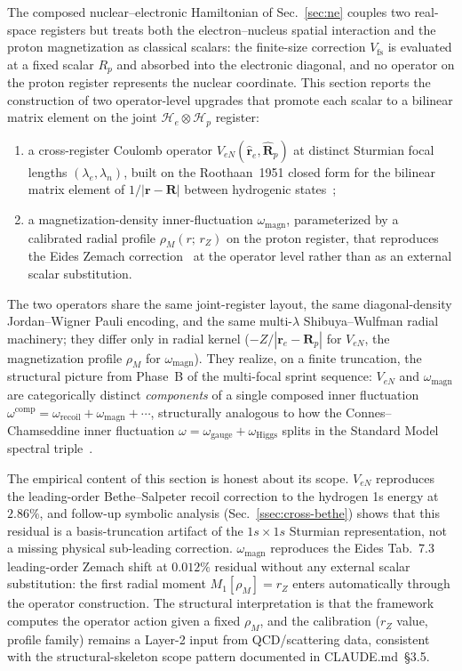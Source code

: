 \documentclass[twocolumn,prc,amsmath,amssymb,superscriptaddress]{revtex4-2}
\begin{document}
The composed nuclear--electronic Hamiltonian of Sec.~\ref{sec:ne} couples
two real-space registers but treats both the electron--nucleus spatial
interaction and the proton magnetization as classical scalars: the
finite-size correction $V_{\mathrm{fs}}$ is evaluated at a fixed scalar
$R_p$ and absorbed into the electronic diagonal, and no operator on the
proton register represents the nuclear coordinate. This section
reports the construction of two operator-level upgrades that promote
each scalar to a bilinear matrix element on the joint
$\mathcal{H}_e \otimes \mathcal{H}_p$ register:
\begin{enumerate}
  \item a cross-register Coulomb operator
    $V_{eN}(\hat{\mathbf{r}}_e, \hat{\mathbf{R}}_p)$ at distinct
    Sturmian focal lengths $(\lambda_e, \lambda_n)$, built on the
    Roothaan~1951 closed form for the bilinear matrix element of
    $1/|\mathbf{r} - \mathbf{R}|$ between hydrogenic
    states~\cite{Roothaan1951};
  \item a magnetization-density inner-fluctuation
    $\omega_{\mathrm{magn}}$, parameterized by a calibrated radial
    profile $\rho_M(r;\,r_Z)$ on the proton register, that reproduces
    the Eides Zemach correction~\cite{EidesGrotchShelyuto2007,Eides2024}
    at the operator level rather than as an external scalar substitution.
\end{enumerate}
The two operators share the same joint-register layout, the same
diagonal-density Jordan--Wigner Pauli encoding, and the same multi-$\lambda$
Shibuya--Wulfman radial machinery; they differ only in radial kernel
($-Z/|\mathbf{r}_e - \mathbf{R}_p|$ for $V_{eN}$, the magnetization
profile $\rho_M$ for $\omega_{\mathrm{magn}}$). They realize, on a finite
truncation, the structural picture from Phase~B of the multi-focal
sprint sequence: $V_{eN}$ and $\omega_{\mathrm{magn}}$ are categorically
distinct \emph{components} of a single composed inner fluctuation
$\omega^{\mathrm{comp}} = \omega_{\mathrm{recoil}} + \omega_{\mathrm{magn}}
+ \cdots$, structurally analogous to how the Connes--Chamseddine inner
fluctuation $\omega = \omega_{\mathrm{gauge}} + \omega_{\mathrm{Higgs}}$
splits in the Standard Model spectral
triple~\cite{ChamseddineConnes2010,Paper32}.

The empirical content of this section is honest about its scope.
$V_{eN}$ reproduces the leading-order Bethe--Salpeter recoil correction
to the hydrogen 1s energy at $2.86\%$, and follow-up symbolic analysis
(Sec.~\ref{ssec:cross-bethe}) shows that this residual is a
basis-truncation artifact of the $1s \times 1s$ Sturmian representation,
not a missing physical sub-leading correction. $\omega_{\mathrm{magn}}$
reproduces the Eides Tab.~7.3 leading-order Zemach shift at
$0.012\%$ residual without any external scalar substitution: the
first radial moment $M_1[\rho_M] = r_Z$ enters automatically through the
operator construction. The structural interpretation is that the
framework computes the operator action given a fixed $\rho_M$, and the
calibration ($r_Z$ value, profile family) remains a Layer-2 input from
QCD/scattering data, consistent with the structural-skeleton scope
pattern documented in CLAUDE.md~\S3.5.
\end{document}
